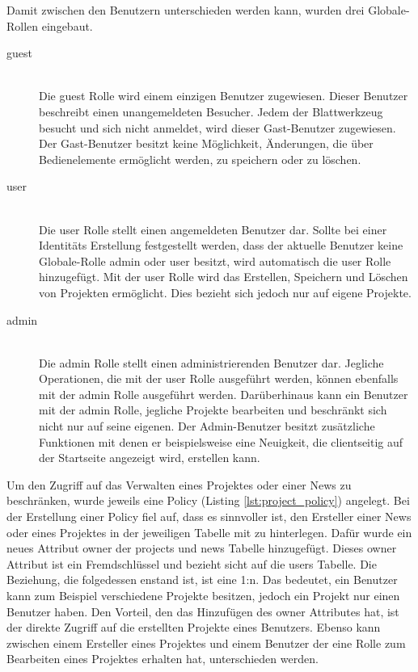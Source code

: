 Damit zwischen den Benutzern unterschieden werden kann, wurden drei Globale-Rollen eingebaut.


\begin{description}
	\item[guest]\hfill\\
	Die guest Rolle wird einem einzigen Benutzer zugewiesen. Dieser Benutzer beschreibt einen unangemeldeten Besucher. Jedem der Blattwerkzeug besucht und sich nicht anmeldet, wird dieser Gast-Benutzer zugewiesen. Der Gast-Benutzer besitzt keine Möglichkeit, Änderungen, die über Bedienelemente ermöglicht werden, zu speichern oder zu löschen.
	\item[user]\hfill\\
	Die user Rolle stellt einen angemeldeten Benutzer dar. Sollte bei einer Identitäts Erstellung festgestellt werden, dass der aktuelle Benutzer keine Globale-Rolle admin oder user besitzt, wird automatisch die user Rolle hinzugefügt. Mit der user Rolle wird das Erstellen, Speichern und Löschen von Projekten ermöglicht. Dies bezieht sich jedoch nur auf eigene Projekte.
	\item[admin]\hfill\\
	Die admin Rolle stellt einen administrierenden Benutzer dar. Jegliche Operationen, die mit der user Rolle ausgeführt werden, können ebenfalls mit der admin Rolle ausgeführt werden. Darüberhinaus kann ein Benutzer mit der admin Rolle, jegliche Projekte bearbeiten und beschränkt sich nicht nur auf seine eigenen. Der Admin-Benutzer besitzt zusätzliche Funktionen mit denen er beispielsweise eine Neuigkeit, die clientseitig auf der Startseite angezeigt wird, erstellen kann.
\end{description}

Um den Zugriff auf das Verwalten eines Projektes oder einer News zu beschränken, wurde jeweils eine Policy (Listing \ref{lst:project_policy}) angelegt. Bei der Erstellung einer Policy fiel auf, dass es sinnvoller ist, den Ersteller einer News oder eines Projektes in der jeweiligen Tabelle mit zu hinterlegen. Dafür wurde ein neues Attribut owner der projects und news Tabelle hinzugefügt. Dieses owner Attribut ist ein Fremdschlüssel und bezieht sicht auf die users Tabelle. Die Beziehung, die folgedessen enstand ist, ist eine 1:n. Das bedeutet, ein Benutzer kann zum Beispiel verschiedene Projekte besitzen, jedoch ein Projekt nur einen Benutzer haben. Den Vorteil, den das Hinzufügen des owner Attributes hat, ist der direkte Zugriff auf die erstellten Projekte eines Benutzers. Ebenso kann zwischen einem Ersteller eines Projektes und einem Benutzer der eine Rolle zum Bearbeiten eines Projektes erhalten hat, unterschieden werden.

